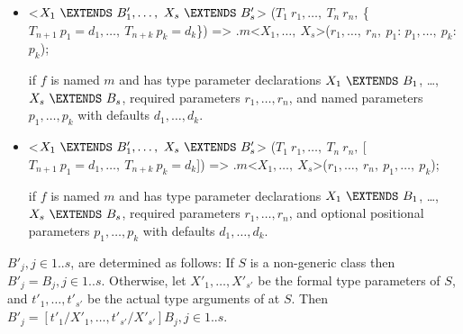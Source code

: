 \documentclass[makeidx]{article}
\begin{document}
\LMHash{}%
\begin{itemize}
\item
\begin{dartCode}
<$X_1\ \EXTENDS\ B'_1, \ldots,\ X_s\ \EXTENDS\ B'_s$>
($T_1\ r_1, \ldots,\ T_n\ r_n,\ $\{$T_{n+1}\ p_1 = d_1, \ldots,\ T_{n+k}\ p_k = d_k$\}) =>
    \SUPER$.m$<$X_1, \ldots,\ X_s$>($r_1, \ldots,\ r_n,\ p_1$: $p_1, \ldots,\ p_k$: $p_k$);
\end{dartCode}
if $f$ is named $m$ and has type parameter declarations
$X_1\ \EXTENDS\ B_1$, \ldots,\ $X_s\ \EXTENDS\ B_s$,
required parameters $r_1, \ldots, r_n$,
and named parameters $p_1, \ldots, p_k$ with defaults $d_1, \ldots, d_k$.
\item
\begin{dartCode}
<$X_1\ \EXTENDS\ B'_1, \ldots,\ X_s\ \EXTENDS\ B'_s$>
($T_1\ r_1, \ldots,\ T_n\ r_n,\ $[$T_{n+1}\ p_1 = d_1, \ldots,\ T_{n+k}\ p_k = d_k$]) =>
    \SUPER.$m$<$X_1, \ldots,\ X_s$>($r_1, \ldots,\ r_n,\ p_1, \ldots,\ p_k$);
\end{dartCode}
if $f$ is named $m$ and has type parameter declarations
$X_1\ \EXTENDS\ B_1$, \ldots,\ $X_s\ \EXTENDS\ B_s$,
required parameters $r_1, \ldots, r_n$,
and optional positional parameters $p_1, \ldots, p_k$ with defaults $d_1, \ldots, d_k$.
\end{itemize}


\LMHash{}%
$B'_j, j \in 1 .. s$, are determined as follows:
If $S$ is a non-generic class then $B'_j = B_j, j \in 1 .. s$.
Otherwise, let $X'_1, \ldots, X'_{s'}$ be the formal type parameters of $S$,
and $t'_1, \ldots, t'_{s'}$ be the actual type arguments of \THIS{} at $S$.
Then $B'_j = [t'_1/X'_1, \ldots, t'_{s'}/X'_{s'}]B_j, j \in 1 .. s$.

\end{document}
